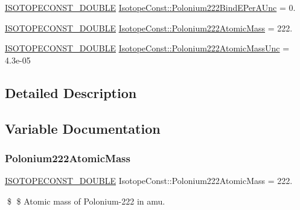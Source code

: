 \begin{DoxyCompactItemize}
\mbox{\hyperlink{group___isotope_const-_macros_ga8f45a7272ce02c0b4c65c44636ed719a}{I\+S\+O\+T\+O\+P\+E\+C\+O\+N\+S\+T\+\_\+\+D\+O\+U\+B\+LE}} \mbox{\hyperlink{group___isotope_const-_polonium-_po222_ga3fc65d67b4f35eabd643fd0293f6d65d}{Isotope\+Const\+::\+Polonium222\+Bind\+E\+Per\+A\+Unc}} = 0.
\item 
\mbox{\hyperlink{group___isotope_const-_macros_ga8f45a7272ce02c0b4c65c44636ed719a}{I\+S\+O\+T\+O\+P\+E\+C\+O\+N\+S\+T\+\_\+\+D\+O\+U\+B\+LE}} \mbox{\hyperlink{group___isotope_const-_polonium-_po222_gaecb574ff40bb97c6eadd63d02d1bd131}{Isotope\+Const\+::\+Polonium222\+Atomic\+Mass}} = 222.
\item 
\mbox{\hyperlink{group___isotope_const-_macros_ga8f45a7272ce02c0b4c65c44636ed719a}{I\+S\+O\+T\+O\+P\+E\+C\+O\+N\+S\+T\+\_\+\+D\+O\+U\+B\+LE}} \mbox{\hyperlink{group___isotope_const-_polonium-_po222_gafef1ce5ed52d8cb2130c92d27f531c6b}{Isotope\+Const\+::\+Polonium222\+Atomic\+Mass\+Unc}} = 4.\+3e-\/05
\end{DoxyCompactItemize}


\subsection{Detailed Description}


\subsection{Variable Documentation}
\mbox{\label{group___isotope_const-_polonium-_po222_gaecb574ff40bb97c6eadd63d02d1bd131}} 
\subsubsection{\texorpdfstring{Polonium222\+Atomic\+Mass}{Polonium222AtomicMass}}
{\footnotesize\ttfamily \mbox{\hyperlink{group___isotope_const-_macros_ga8f45a7272ce02c0b4c65c44636ed719a}{I\+S\+O\+T\+O\+P\+E\+C\+O\+N\+S\+T\+\_\+\+D\+O\+U\+B\+LE}} Isotope\+Const\+::\+Polonium222\+Atomic\+Mass = 222.}

\$ \$ Atomic mass of Polonium-\/222 in amu. \mbox{\label{group___isotope_const-_polonium-_po222_gafef1ce5ed52d8cb2130c92d27f531c6b}} 
